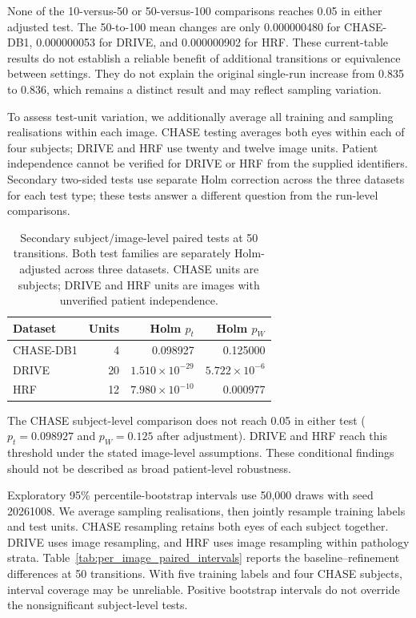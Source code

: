 \documentclass[jimaging,article,submit,pdftex,moreauthors]{Definitions/mdpi}%
\begin{document}
None of the 10-versus-50 or 50-versus-100 comparisons reaches 0.05 in either adjusted test. The 50-to-100 mean changes are only 0.000000480 for CHASE-DB1, 0.000000053 for DRIVE, and 0.000000902 for HRF. These current-table results do not establish a reliable benefit of additional transitions or equivalence between settings. They do not explain the original single-run increase from 0.835 to 0.836, which remains a distinct result and may reflect sampling variation.



To assess test-unit variation, we additionally average all training and sampling realisations within each image. CHASE testing averages both eyes within each of four subjects; DRIVE and HRF use twenty and twelve image units. Patient independence cannot be verified for DRIVE or HRF from the supplied identifiers. Secondary two-sided tests use separate Holm correction across the three datasets for each test type; these tests answer a different question from the run-level comparisons.



\begin{table}[htbp]
\centering
\caption{Secondary subject/image-level paired tests at 50 transitions. Both test families are separately Holm-adjusted across three datasets. CHASE units are subjects; DRIVE and HRF units are images with unverified patient independence.}
\label{tab:paired_statistical_tests}
\scriptsize
\begin{tabular}{lrrr}
\toprule
Dataset & Units & Holm $p_t$ & Holm $p_W$ \\
\midrule
CHASE-DB1 & 4 & 0.098927 & 0.125000 \\
DRIVE & 20 & $1.510\times10^{-29}$ & $5.722\times10^{-6}$ \\
HRF & 12 & $7.980\times10^{-10}$ & 0.000977 \\
\bottomrule
\end{tabular}
\end{table}



The CHASE subject-level comparison does not reach 0.05 in either test ($p_t=0.098927$ and $p_W=0.125$ after adjustment). DRIVE and HRF reach this threshold under the stated image-level assumptions. These conditional findings should not be described as broad patient-level robustness.



Exploratory 95\% percentile-bootstrap intervals use 50,000 draws with seed 20261008. We average sampling realisations, then jointly resample training labels and test units. CHASE resampling retains both eyes of each subject together. DRIVE uses image resampling, and HRF uses image resampling within pathology strata. Table~\ref{tab:per_image_paired_intervals} reports the baseline--refinement differences at 50 transitions. With five training labels and four CHASE subjects, interval coverage may be unreliable. Positive bootstrap intervals do not override the nonsignificant subject-level tests.
\end{document}
